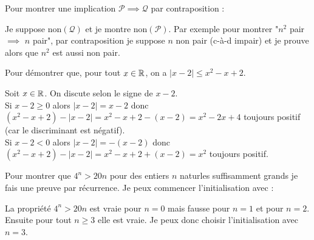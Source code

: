 \begin{question}
Pour montrer une implication $\mathcal{P} \implies \mathcal{Q}$ par contraposition :
\begin{answers} 
\end{answers}
\begin{explanations} 
Je suppose $\text{non}(\mathcal{Q})$ et je montre $\text{non}(\mathcal{P})$.
Par exemple pour montrer "$n^2$ pair $\implies$ $n$ pair", par contraposition je suppose $n$ non pair (c-à-d impair)
et je prouve alors que $n^2$ est aussi non pair. 
\end{explanations}
\end{question}


\begin{question}
Pour démontrer que, pour tout $x\in\mathbb{R}$, on a $|x-2| \le x^2-x+2$.
\begin{answers} 
\end{answers}
\begin{explanations} 
Soit $x\in\mathbb{R}$. On discute selon le signe de $x-2$.\\
Si $x-2\ge0$ alors $|x-2| = x-2$ donc $(x^2-x+2) - |x-2| = x^2-x+2 - (x-2) = x^2-2x+4$ toujours positif (car le discriminant est négatif).\\
Si $x-2<0$ alors $|x-2| = -(x-2)$ donc $(x^2-x+2) - |x-2| = x^2-x+2 + (x-2) = x^2$ toujours positif. 
\end{explanations}
\end{question}


\begin{question}
Pour montrer que $4^n > 20n$ pour des entiers $n$ naturles suffisamment grands je fais une preuve par récurrence.
Je peux commencer l'initialisation avec :
\begin{answers} 
\end{answers}
\begin{explanations} 
La propriété $4^n > 20n$ est vraie pour $n=0$ mais fausse pour $n=1$ et pour $n=2$.
Ensuite pour tout $n\ge3$ elle est vraie.
Je peux donc choisir l'initialisation avec $n=3$.\end{explanations}
\end{question}


